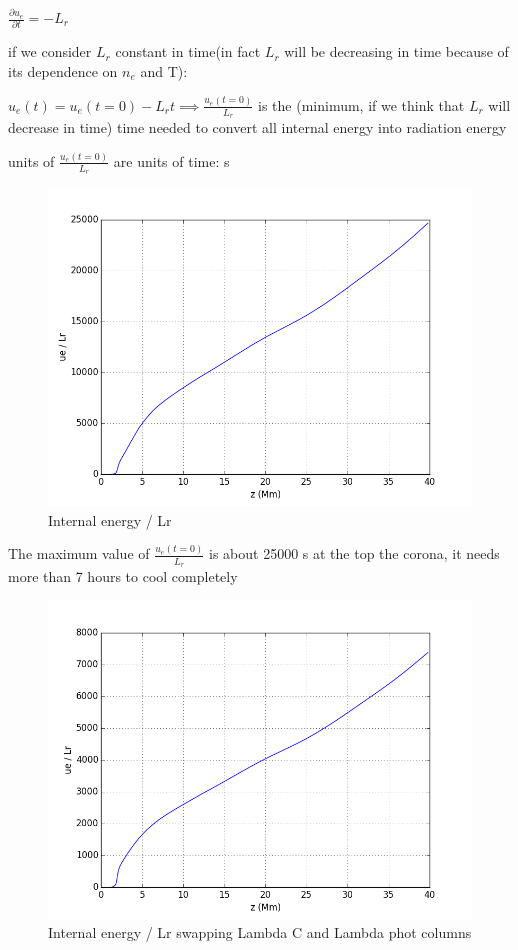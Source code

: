 \documentclass[10pt]{book}
\begin{document}
$ \frac{\partial u_e}{\partial t} = -L_r$

if we consider $L_r$ constant in time(in fact $L_r$ will be decreasing in time because of its dependence on $n_e$ and T):

$u_e(t) = u_e(t=0) - L_r t \implies \frac{u_e(t=0)}{L_r}$ is the (minimum, if we think that
$L_r$ will decrease in time) time needed to convert all internal energy into radiation energy

units of $\frac{u_e(t=0)}{L_r}$ are units of time: s

\begin{figure}[H]
 \centering
 \includegraphics[scale=0.5]{ueDivLr.png}
 \caption{ Internal energy / Lr}
\end{figure}

The maximum value of $\frac{u_e(t=0)}{L_r} $ is about 25000 s at the top the corona, it needs more than  7 hours to cool completely

\begin{figure}[H]
 \centering
 \includegraphics[scale=0.5]{ueDivLrREVERSED.png}
 \caption{ Internal energy / Lr swapping Lambda C and Lambda phot columns}
\end{figure}
\end{document}

